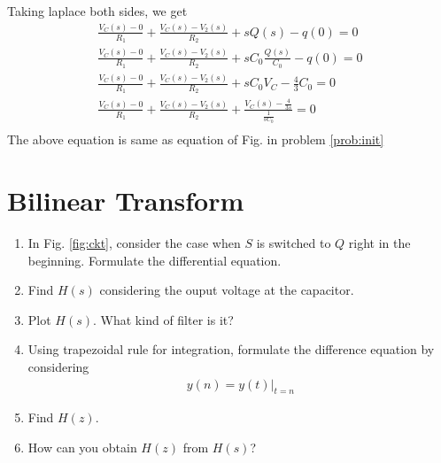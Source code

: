 \documentclass[journal,12pt,twocolumn]{IEEEtran}
\renewcommand\thesection{\arabic{section}}
\begin{document}
\begin{enumerate}[label=\arabic*.,ref=\thesection.\theenumi]
Taking laplace both sides, we get
\begin{align}
	\frac{V_{C}(s)-0}{R_1}+\frac{V_{C}(s)-V_{2}(s)}{R_2}+sQ(s)-q(0)=0\\
	\frac{V_{C}(s)-0}{R_1}+\frac{V_{C}(s)-V_{2}(s)}{R_2}+sC_0\frac{Q(s)}{C_0}-q(0)=0\\
	\frac{V_{C}(s)-0}{R_1}+\frac{V_{C}(s)-V_{2}(s)}{R_2}+sC_0V_{C}-\frac{4}{3}C_0=0\\
	\frac{V_{C}(s)-0}{R_1}+\frac{V_{C}(s)-V_{2}(s)}{R_2}+\frac{V_{C}(s)-\frac{4}{3s}}{\frac{1}{sC_0}}=0\\
\end{align}
The above equation is same as equation of Fig. in problem 
		\ref{prob:init}

	\end{enumerate}
 \section{Bilinear Transform}
\begin{enumerate}[label=\arabic*.,ref=\thesection.\theenumi]
\item In Fig. 
			\ref{fig:ckt},
			consider the case when $S$ is switched to $Q$ right in the beginning. Formulate the differential equation.
		\item 			Find $H(s)$ considering the ouput voltage at the capacitor.
		\item Plot $H(s)$.  What kind of filter is it?
		\item Using trapezoidal rule for integration, formulate the difference equation
			by considering 
		\begin{align}
			y(n) = y(t)\vert_{t=n}
		\end{align}
	\item Find $H(z)$.
	\item How can you obtain $H(z)$ from $H(s)$?
	\end{enumerate}
\end{document}
